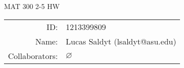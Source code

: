 \documentclass[notitlepage]{homework}
\author{Lucas Saldyt}
\title{\AssignmentName}
\newcommand{\AssignmentName}{MAT 300 2-5 HW}
\begin{document}

\begin{titlepage}
	\begin{center}
		{\Large \AssignmentName}
		
		\bigskip

		\begin{tabular}{rl}
			ID: & 1213399809 \\ %
            Name: & Lucas Saldyt (lsaldyt@asu.edu) \\ %
			Collaborators: & $\varnothing$
		\end{tabular}

		\bigskip

	\end{center}

	\toccontents

	\vfill

\end{titlepage}

 
 
 

 

\end{document}
